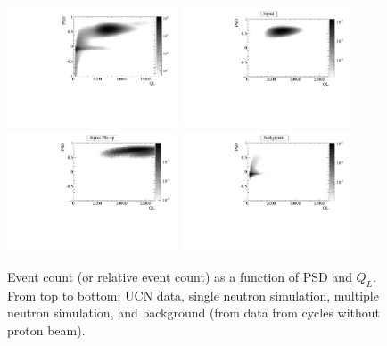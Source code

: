 \documentclass[letter,twocolumn,preprint,3p,numbers,sort&compress]{elsarticle}
\begin{document}
\begin{figure}[!htpb]
\centering
\includegraphics[width=0.45\textwidth]{figures/2DGrayscale.pdf}
\includegraphics[width=0.45\textwidth]{figures/hsig_psdql.pdf}
\includegraphics[width=0.45\textwidth]{figures/hsigpile_psdql.pdf}
\includegraphics[width=0.45\textwidth]{figures/hbg_psdql.pdf}
\caption{ Event count (or relative event count) as a function of PSD
  and $Q_L$. From top to bottom: UCN data,
  single neutron simulation, multiple neutron simulation, and background (from
  data from cycles without proton beam).} \label{fig:eventSpectra}
\end{figure}
\end{document}
